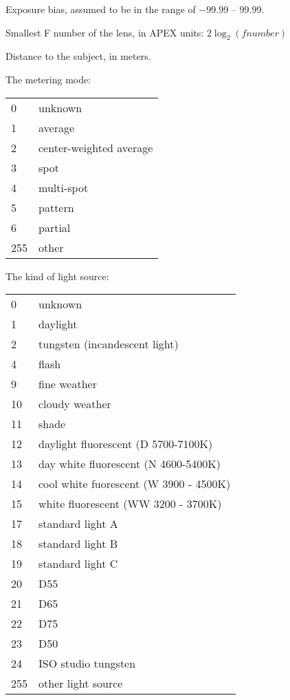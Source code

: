 Exposure bias, assumed to be in the range of $-99.99$ -- $99.99$.
\apiend

Smallest F number of the lens, in APEX units: $2 \log_2 (\mathit{fnumber})$
\apiend

Distance to the subject, in meters.
\apiend

The metering mode:

\smallskip

\begin{tabular}{p{0.3in} p{4in}}
0 & unknown \\
1 & average \\
2 & center-weighted average \\
3 & spot \\
4 & multi-spot \\
5 & pattern \\
6 & partial \\
255 & other
\end{tabular}
\apiend

The kind of light source:

\smallskip

\begin{tabular}{p{0.3in} p{4in}}
0 & unknown \\
1 & daylight \\
2 & tungsten (incandescent light) \\
4 & flash \\
9 & fine weather \\
10 & cloudy weather \\
11 & shade \\
12 & daylight fluorescent (D 5700-7100K) \\
13 & day white fluorescent (N 4600-5400K) \\
14 & cool white fuorescent (W 3900 - 4500K) \\
15 & white fluorescent (WW 3200 - 3700K) \\
17 & standard light A \\
18 & standard light B \\
19 & standard light C \\
20 & D55 \\
21 & D65 \\
22 & D75 \\
23 & D50 \\
24 & ISO studio tungsten \\
255 & other light source
\end{tabular}
\apiend

